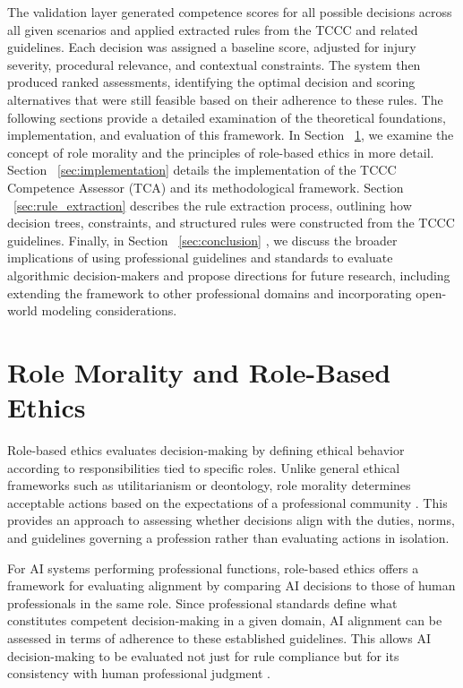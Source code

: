 \documentclass[conference]{IEEEtran}
\begin{document}

The validation layer generated competence scores for all possible decisions across all given scenarios and applied extracted rules from the TCCC and related guidelines. Each decision was assigned a baseline score, adjusted for injury severity, procedural relevance, and contextual constraints. The system then produced ranked assessments, identifying the optimal decision and scoring alternatives that were still feasible based on their adherence to these rules.
The following sections provide a detailed examination of the theoretical foundations, implementation, and evaluation of this framework.
In Section ~\ref{sec:role_morality}, we examine the concept of role morality and the principles of role-based ethics in more detail. Section ~\ref{sec:implementation} details the implementation of the TCCC Competence Assessor (TCA) and its methodological framework. Section ~\ref{sec:rule_extraction} describes the rule extraction process, outlining how decision trees, constraints, and structured rules were constructed from the TCCC guidelines. Finally, in Section ~\ref{sec:conclusion} , we discuss the broader implications of using professional guidelines and standards to evaluate algorithmic decision-makers and propose directions for future research, including extending the framework to other professional domains and incorporating open-world modeling considerations.
% 
\section{Role Morality and Role-Based Ethics}
\label{sec:role_morality}
Role-based ethics evaluates decision-making by defining ethical behavior according to responsibilities tied to specific roles. Unlike general ethical frameworks such as utilitarianism or deontology, role morality determines acceptable actions based on the expectations of a professional community \cite{dawson_professional_1994}. This provides an approach to assessing whether decisions align with the duties, norms, and guidelines governing a profession rather than evaluating actions in isolation.

For AI systems performing professional functions, role-based ethics offers a framework for evaluating alignment by comparing AI decisions to those of human professionals in the same role. Since professional standards define what constitutes competent decision-making in a given domain, AI alignment can be assessed in terms of adherence to these established guidelines. This allows AI decision-making to be evaluated not just for rule compliance but for its consistency with human professional judgment \cite{dubber_oxford_2020}.
\end{document}
